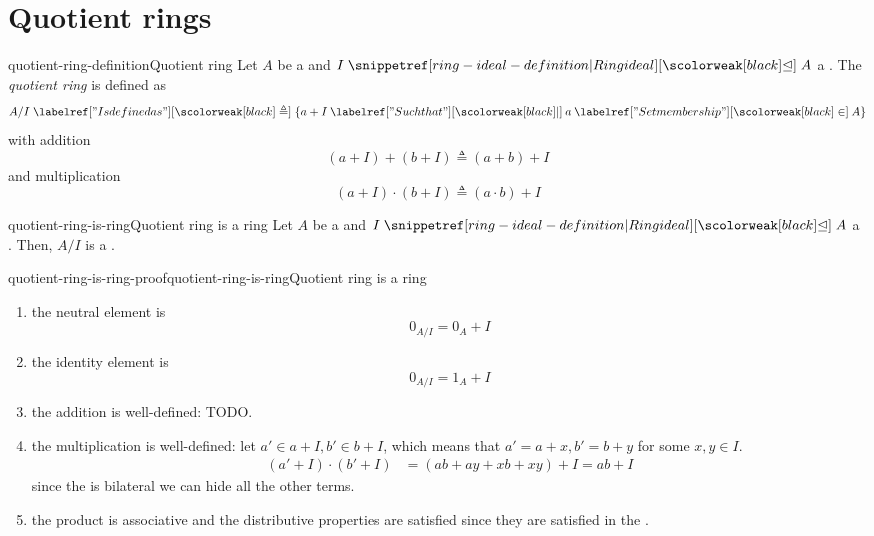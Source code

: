 \documentclass[preview]{standalone}
\begin{document}
\genpage

\section{Quotient rings}

\begin{snippetdefinition}{quotient-ring-definition}{Quotient ring}
    Let \(A\) be a \ring
    and \(I \idealin A\) a .
    The \emph{quotient ring} is defined as
    \[
        A/I \triangleq \{
            a + I \suchthat a \in A   
        \}
    \]
    with addition
    \[
        (a+I) + (b+I) \triangleq (a+b) + I
    \]
    and multiplication
    \[
        (a+I) \cdot (b+I) \triangleq (a \cdot b) + I
    \]
\end{snippetdefinition}


\begin{snippetproposition}{quotient-ring-is-ring}{Quotient ring is a ring}
    Let \(A\) be a \ring
    and \(I \idealin A\) a .
    Then, \(A/I\) is a \ring.
\end{snippetproposition}

\begin{snippetproof}{quotient-ring-is-ring-proof}{quotient-ring-is-ring}{Quotient ring is a ring}
    \begin{enumerate}
        \item the neutral element is
        \[
            0_{A/I} = 0_A + I
        \]
        \item the identity element is
        \[
            0_{A/I} = 1_A + I
        \]
        \item the addition is well-defined: TODO.
        \item the multiplication is well-defined:
        let \(a' \in a + I, b' \in b+I\),
        which means that \(a' = a+x, b' =b+y\) for some \(x,y \in I\).
        \begin{align*}
            (a'+I) \cdot (b' + I)
            &= (ab+ay+xb + xy) + I
            = ab + I
        \end{align*}
        since the \ideal is bilateral we can hide all the other terms.
        \item the product is associative and the distributive properties are satisfied
        since they are satisfied in the \ring.
    \end{enumerate}
\end{snippetproof}
\end{document}
